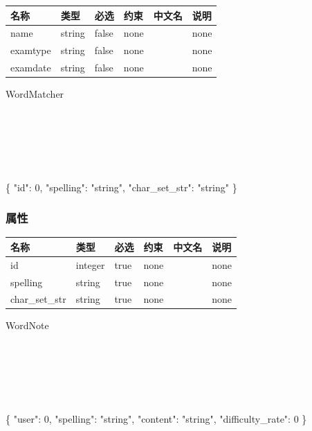 \documentclass[
]{article}
\newenvironment{Shaded}{}{}
\newcommand{\DataTypeTok}[1]{\textcolor[rgb]{0.56,0.13,0.00}{#1}}
\newcommand{\DecValTok}[1]{\textcolor[rgb]{0.25,0.63,0.44}{#1}}
\newcommand{\FunctionTok}[1]{\textcolor[rgb]{0.02,0.16,0.49}{#1}}
\newcommand{\StringTok}[1]{\textcolor[rgb]{0.25,0.44,0.63}{#1}}
\begin{document}
\begin{longtable}[]{@{}llllll@{}}
\toprule
名称 & 类型 & 必选 & 约束 & 中文名 & 说明 \\
\midrule
\endhead
name & string & false & none & & none \\
examtype & string & false & none & & none \\
examdate & string & false & none & & none \\
\bottomrule
\end{longtable}

WordMatcher

\strut \\
\strut \\
\strut \\

\begin{Shaded}
\begin{Highlighting}[]
\FunctionTok{\{}
  \DataTypeTok{"id"}\FunctionTok{:} \DecValTok{0}\FunctionTok{,}
  \DataTypeTok{"spelling"}\FunctionTok{:} \StringTok{"string"}\FunctionTok{,}
  \DataTypeTok{"char\_set\_str"}\FunctionTok{:} \StringTok{"string"}
\FunctionTok{\}}
\end{Highlighting}
\end{Shaded}

\hypertarget{ux5c5eux6027-4}{%
\subsubsection{属性}\label{ux5c5eux6027-4}}

\begin{longtable}[]{@{}llllll@{}}
\toprule
名称 & 类型 & 必选 & 约束 & 中文名 & 说明 \\
\midrule
\endhead
id & integer & true & none & & none \\
spelling & string & true & none & & none \\
char\_set\_str & string & true & none & & none \\
\bottomrule
\end{longtable}

WordNote

\strut \\
\strut \\
\strut \\

\begin{Shaded}
\begin{Highlighting}[]
\FunctionTok{\{}
  \DataTypeTok{"user"}\FunctionTok{:} \DecValTok{0}\FunctionTok{,}
  \DataTypeTok{"spelling"}\FunctionTok{:} \StringTok{"string"}\FunctionTok{,}
  \DataTypeTok{"content"}\FunctionTok{:} \StringTok{"string"}\FunctionTok{,}
  \DataTypeTok{"difficulty\_rate"}\FunctionTok{:} \DecValTok{0}
\FunctionTok{\}}
\end{Highlighting}
\end{Shaded}
\end{document}
